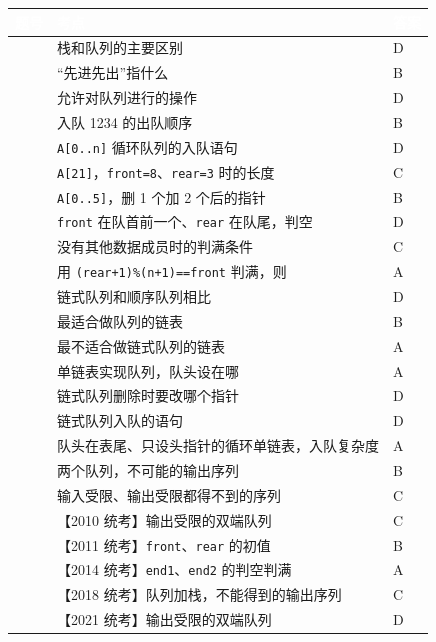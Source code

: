 \documentclass[10.5pt,a4paper,oneside]{article}
\begin{document}
{
\begin{xltabular}{\linewidth}{>{\hsize\raggedright\arraybackslash}X>{\hsize\raggedright\arraybackslash}X>{\hsize\raggedright\arraybackslash}X}
\textcolor{white}{\bfseries 题号} & \textcolor{white}{\bfseries 考点} & \textcolor{white}{\bfseries 答案} \\
 & 栈和队列的主要区别 & D \\  & “先进先出”指什么 & B \\  & 允许对队列进行的操作 & D \\  & 入队 1234 的出队顺序 & B \\  & \texttt{A{[}0..n{]}} 循环队列的入队语句 & D \\  & \texttt{A{[}21{]}}，\texttt{front=8}、\texttt{rear=3} 时的长度 & C \\  & \texttt{A{[}0..5{]}}，删 1 个加 2 个后的指针 & B \\  & \texttt{front} 在队首前一个、\texttt{rear} 在队尾，判空 & D \\  & 没有其他数据成员时的判满条件 & C \\  & 用 \texttt{(rear+1)\%(n+1)==front} 判满，则 & A \\  & 链式队列和顺序队列相比 & D \\  & 最适合做队列的链表 & B \\  & 最不适合做链式队列的链表 & A \\  & 单链表实现队列，队头设在哪 & A \\  & 链式队列删除时要改哪个指针 & D \\  & 链式队列入队的语句 & D \\  & 队头在表尾、只设头指针的循环单链表，入队复杂度 & A \\  & 两个队列，不可能的输出序列 & B \\  & 输入受限、输出受限都得不到的序列 & C \\  & 【2010 统考】输出受限的双端队列 & C \\  & 【2011 统考】\texttt{front}、\texttt{rear} 的初值 & B \\  & 【2014 统考】\texttt{end1}、\texttt{end2} 的判空判满 & A \\  & 【2018 统考】队列加栈，不能得到的输出序列 & C \\  & 【2021 统考】输出受限的双端队列 & D \\ \hline
\end{xltabular}\par\vspace{4pt}}
\end{document}

